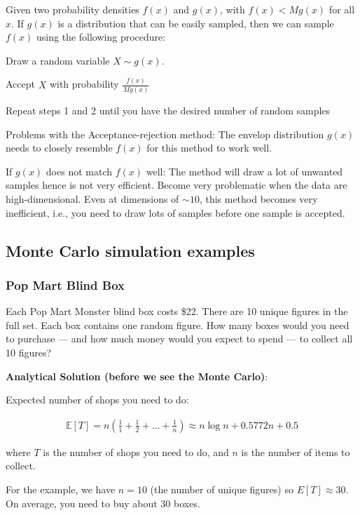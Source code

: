 Given two probability densities $f(x)$ and $g(x)$, with $f(x)<Mg(x)$ for all $x$. If $g(x)$ is a distribution that can be easily sampled, then we can sample $f(x)$ using the following procedure:

\step Draw a random variable $X\sim g(x)$.

\step Accept $X$ with probability $\frac{f(x)}{Mg(x)}$

\step Repeat steps 1 and 2 until you have the desired number of random samples

Problems with the Acceptance-rejection method: The envelop distribution $g(x)$ needs to closely resemble $f(x)$ for this method to work well.

If $g(x)$ does not match $f(x)$ well: The method will draw a lot of unwanted samples hence is not very efficient. Become very problematic when the data are high-dimensional. Even at dimensions of $\sim 10$, this method becomes very inefficient, i.e., you need to draw lots of samples before one sample is accepted.

\subsection{Monte Carlo simulation examples}

\subsubsection{Pop Mart Blind Box}

\indent 

Each Pop Mart Monster blind box costs \$22. There are 10 unique figures in the full set. Each box contains one random figure. How many boxes would you need to purchase — and how much money would you expect to spend — to collect all 10 figures?

\bigskip

\noindent\textbf{Analytical Solution (before we see the Monte Carlo)}:

Expected number of shops you need to do:

\begin{align*}
    \mathbb{E}[T] = n(\frac{1}{1}+\frac{1}{2}+\ldots + \frac{1}{n}) \approx n\log n+0.5772n+0.5
\end{align*}

where $T$ is the number of shops you need to do, and $n$ is the number of items to collect.

For the example, we have $n=10$ (the number of unique figures) so $E[T]≈30$. On average, you need to buy about 30 boxes.

